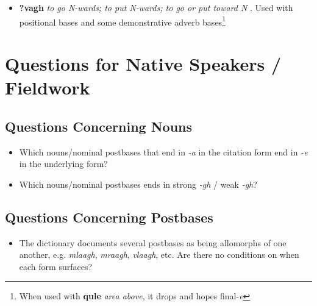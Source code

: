 \documentclass{article}
\begin{document}
\begin{itemize}
\renewcommand\labelitemi{$\cdot$}

\item \textbf{?vagh} \textit{to go N-wards; to put N-wards; to go or put toward N} . Used with positional bases and some demonstrative adverb bases\footnote{When used with \textbf{qule} \textit{area above}, it drops and hopes final-\textit{e}}

\end{itemize}




\section{Questions for Native Speakers / Fieldwork}


\subsection{Questions Concerning Nouns}

\begin{itemize}
\renewcommand\labelitemi{$\cdot$}

\item Which nouns/nominal postbases that end in \textit{-a} in the citation form end in \textit{-e} in the underlying form? 

\item Which nouns/nominal postbases ends in strong \textit{-gh} / weak \textit{-gh}? 

\end{itemize}

\subsection{Questions Concerning Postbases}

\begin{itemize}
\renewcommand\labelitemi{$\cdot$}

\item The dictionary documents several postbases as being allomorphs of one another, e.g. \textit{mlaagh}, \textit{mraagh}, \textit{vlaagh}, etc.
%
Are there no conditions on when each form surfaces?

\end{itemize}
\end{document}
